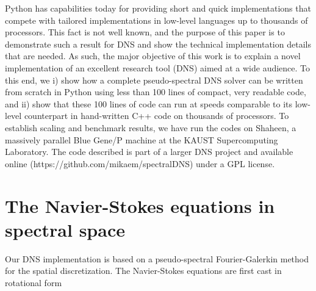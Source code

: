 \documentclass[final,3p,times,twocolumn]{elsarticle}
\begin{document}
Python has capabilities today for providing short and quick implementations 
that compete with tailored implementations in low-level languages up to 
thousands of processors. This fact is not well known, and the purpose of this 
paper is to demonstrate such a result for DNS and show the technical 
implementation details that are needed. As such, the major objective of this 
work is to explain a novel implementation of an excellent research tool (DNS) 
aimed at a wide audience. To this end, we i) show how a complete 
pseudo-spectral DNS solver can be written from scratch in Python using less 
than 100 lines of compact, very readable code, and ii) show that these 100 
lines of code can run at speeds comparable to its low-level counterpart in 
hand-written C++ code on thousands of processors. To establish scaling and 
benchmark results, we have run the codes on Shaheen, a massively parallel 
Blue Gene/P machine at the KAUST Supercomputing Laboratory. The code described 
is part of a larger DNS project and available online 
(https://github.com/mikaem/spectralDNS) under a GPL license. 

\section{The Navier-Stokes equations in spectral space}
Our DNS implementation is based on a pseudo-spectral Fourier-Galerkin method \cite{canuto1988} for the spatial discretization. The Navier-Stokes equations are first cast in rotational form
\end{document}
